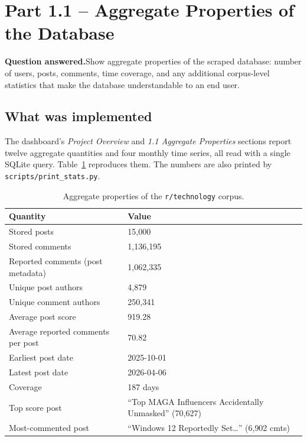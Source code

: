 \documentclass[11pt,a4paper]{article}
\newcommand{\questionanswered}[1]{%
  \par\medskip\noindent\textbf{Question answered.}\quad #1\par\medskip%
}
\begin{document}
\section{Part 1.1 -- Aggregate Properties of the Database}
\label{sec:11}

\questionanswered{Show aggregate properties of the scraped database: number of users, posts,
comments, time coverage, and any additional corpus-level statistics that make the database
understandable to an end user.}

\subsection{What was implemented}
The dashboard's \emph{Project Overview} and \emph{1.1 Aggregate Properties} sections report
twelve aggregate quantities and four monthly time series, all read with a single SQLite query.
Table~\ref{tab:agg} reproduces them. The numbers are also printed by
\texttt{scripts/print\_stats.py}.

\begin{table}[H]
\centering
\caption{Aggregate properties of the \texttt{r/technology} corpus.}
\label{tab:agg}
\renewcommand{\arraystretch}{1.15}
\begin{tabularx}{\linewidth}{p{5.0cm} X}
\toprule
\textbf{Quantity} & \textbf{Value} \\
\midrule
Stored posts                              & 15{,}000 \\
Stored comments                           & 1{,}136{,}195 \\
Reported comments (post metadata)         & 1{,}062{,}335 \\
Unique post authors                       & 4{,}879 \\
Unique comment authors                    & 250{,}341 \\
Average post score                        & 919.28 \\
Average reported comments per post        & 70.82 \\
Earliest post date                        & 2025-10-01 \\
Latest post date                          & 2026-04-06 \\
Coverage                                  & 187 days \\
Top score post & ``Top MAGA Influencers Accidentally Unmasked'' (70{,}627) \\
Most-commented post & ``Windows 12 Reportedly Set\ldots'' (6{,}902 cmts) \\
\bottomrule
\end{tabularx}
\end{table}
\end{document}
